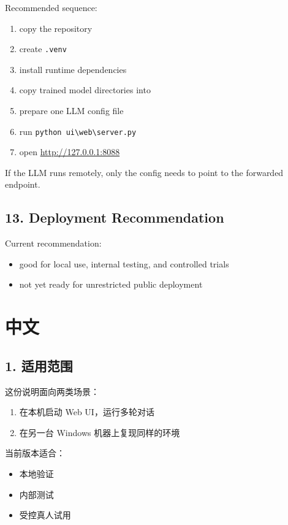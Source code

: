 \documentclass[11pt,a4paper]{ctexart}
\begin{document}
Recommended sequence:

\begin{enumerate}
\item copy the repository
\item create \texttt{.venv}
\item install runtime dependencies
\item copy trained model directories into 
\item prepare one LLM config file
\item run \texttt{python ui\textbackslash web\textbackslash server.py}
\item open \url{http://127.0.0.1:8088}
\end{enumerate}

If the LLM runs remotely, only the config  needs to point to the forwarded endpoint.

\subsection*{13. Deployment Recommendation}

Current recommendation:

\begin{itemize}
\item good for local use, internal testing, and controlled trials
\item not yet ready for unrestricted public deployment
\end{itemize}

\newpage
\section*{中文}

\subsection*{1. 适用范围}

这份说明面向两类场景：

\begin{enumerate}
\item 在本机启动 Web UI，运行多轮对话
\item 在另一台 Windows 机器上复现同样的环境
\end{enumerate}

当前版本适合：

\begin{itemize}
\item 本地验证
\item 内部测试
\item 受控真人试用
\end{itemize}
\end{document}
